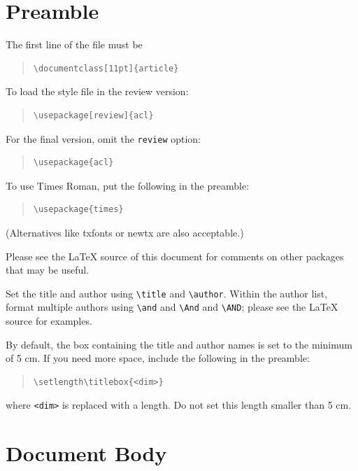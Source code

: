 \documentclass[11pt]{article}
\begin{document}
\section{Preamble}

The first line of the file must be
\begin{quote}
\begin{verbatim}
\documentclass[11pt]{article}
\end{verbatim}
\end{quote}

To load the style file in the review version:
\begin{quote}
\begin{verbatim}
\usepackage[review]{acl}
\end{verbatim}
\end{quote}
For the final version, omit the \verb|review| option:
\begin{quote}
\begin{verbatim}
\usepackage{acl}
\end{verbatim}
\end{quote}

To use Times Roman, put the following in the preamble:
\begin{quote}
\begin{verbatim}
\usepackage{times}
\end{verbatim}
\end{quote}
(Alternatives like txfonts or newtx are also acceptable.)

Please see the \LaTeX{} source of this document for comments on other packages that may be useful.

Set the title and author using \verb|\title| and \verb|\author|. Within the author list, format multiple authors using \verb|\and| and \verb|\And| and \verb|\AND|; please see the \LaTeX{} source for examples.

By default, the box containing the title and author names is set to the minimum of 5 cm. If you need more space, include the following in the preamble:
\begin{quote}
\begin{verbatim}
\setlength\titlebox{<dim>}
\end{verbatim}
\end{quote}
where \verb|<dim>| is replaced with a length. Do not set this length smaller than 5 cm.

\section{Document Body}
\end{document}
